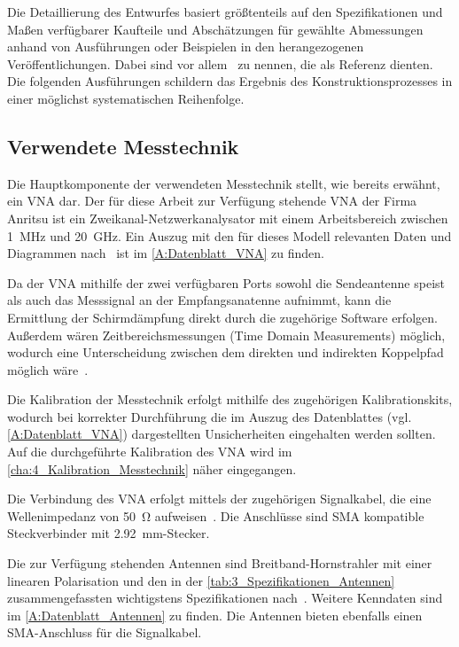
Die Detaillierung des Entwurfes basiert größtenteils auf den Spezifikationen und Maßen verfügbarer Kaufteile und Abschätzungen für gewählte Abmessungen anhand von Ausführungen oder Beispielen in den herangezogenen Veröffentlichungen. Dabei sind vor allem~\cite{Design_of_shielded_enclosures, EMV-gerechtes_Geraetedesign, EM_Schirmung, Simplified_shielding, Handbook_Shielding_Materials_and_Performance} zu nennen, die als Referenz dienten. Die folgenden Ausführungen schildern das Ergebnis des Konstruktionsprozesses in einer möglichst systematischen Reihenfolge.

\subsection{Verwendete Messtechnik}

Die Hauptkomponente der verwendeten Messtechnik stellt, wie bereits erwähnt, ein \ac{VNA} dar. Der für diese Arbeit zur Verfügung stehende \ac{VNA} der Firma Anritsu ist ein Zweikanal-Netzwerkanalysator mit einem Arbeitsbereich zwischen \SI{1}{\mega\hertz} und \SI{20}{\giga\hertz}. Ein Auszug mit den für dieses Modell relevanten Daten und Diagrammen nach~\cite{VNA-Datenblatt} ist im \Anhang\ref{A:Datenblatt_VNA} zu finden. 
\par
\vspace{\linespace}
Da der \ac{VNA} mithilfe der zwei verfügbaren Ports sowohl die Sendeantenne speist als auch das Messsignal an der Empfangsanatenne aufnimmt, kann die Ermittlung der Schirmdämpfung direkt durch die zugehörige Software erfolgen. Außerdem wären Zeitbereichsmessungen (Time Domain Measurements) möglich, wodurch eine Unterscheidung zwischen dem direkten und indirekten Koppelpfad möglich wäre~\cite{Techniques_Shielding_Effectiveness_Far_Field_Simulation}. %
\par
\vspace{\linespace}
Die Kalibration der Messtechnik erfolgt mithilfe des zugehörigen Kalibrationskits, wodurch bei korrekter Durchführung die im Auszug des Datenblattes (vgl. \Anhang\ref{A:Datenblatt_VNA}) dargestellten Unsicherheiten eingehalten werden sollten. Auf die durchgeführte Kalibration des \ac{VNA} wird im \Abschnitt\ref{cha:4_Kalibration_Messtechnik} näher eingegangen.
\par
\vspace{\linespace}
Die Verbindung des \ac{VNA} erfolgt mittels der zugehörigen Signalkabel, die eine Wellenimpedanz von \SI{50}{\ohm} aufweisen~\cite{Testkabel_VNA-Datenblatt}. Die Anschlüsse sind \ac{SMA} kompatible Steckverbinder mit \SI{2,92}{\milli\meter}-Stecker.
\par
\vspace{\linespace}
Die zur Verfügung stehenden Antennen sind Breitband-Hornstrahler mit einer linearen Polarisation und den in der \Tabelle\ref{tab:3_Spezifikationen_Antennen} zusammengefassten wichtigstens Spezifikationen nach~\cite{Antennen-Datenblatt}. Weitere Kenndaten sind im \Anhang\ref{A:Datenblatt_Antennen} zu finden. Die Antennen bieten ebenfalls einen SMA-Anschluss für die Signalkabel.

